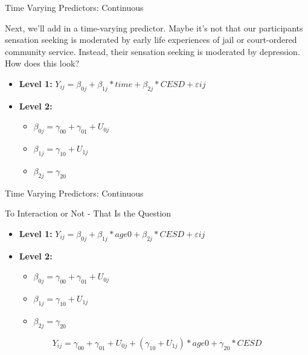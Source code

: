 \documentclass[ignorenonframetext,]{beamer}
\begin{document}
\begin{frame}{Time Varying Predictors: Continuous}

Next, we'll add in a time-varying predictor. Maybe it's not that our
participants sensation seeking is moderated by early life experiences of
jail or court-ordered community service. Instead, their sensation
seeking is moderated by depression.\\
How does this look?

\begin{itemize}
  \item \textbf{Level 1:} $Y_{ij} = \beta_{0j} + \beta_{1j}*time + \beta_{2j}*CESD + \varepsilon{ij}$
  \item \textbf{Level 2:} 
    \begin{itemize} 
      \item $\beta_{0j} = \gamma_{00} + \gamma_{01} + U_{0j}$
      \item $\beta_{1j} = \gamma_{10} + U_{1j}$
      \item $\beta_{2j} = \gamma_{20}$
    \end{itemize}
\end{itemize}

\end{frame}

\begin{frame}{Time Varying Predictors: Continuous}

\begin{block}{To Interaction or Not - That Is the Question}

\begin{itemize}
  \item \textbf{Level 1:} $Y_{ij} = \beta_{0j} + \beta_{1j}*age0 + \beta_{2j}*CESD + \varepsilon{ij}$
  \item \textbf{Level 2:} 
    \begin{itemize} 
      \item $\beta_{0j} = \gamma_{00} + \gamma_{01} + U_{0j}$
      \item $\beta_{1j} = \gamma_{10} + U_{1j}$
      \item $\beta_{2j} = \gamma_{20}$
    \end{itemize}
\end{itemize}

\[Y_{ij} =  \gamma_{00} + \gamma_{01} + U_{0j} + (\gamma_{10} + U_{1j})*age0 + \gamma_{20}*CESD\]

\end{block}

\end{frame}
\end{document}
